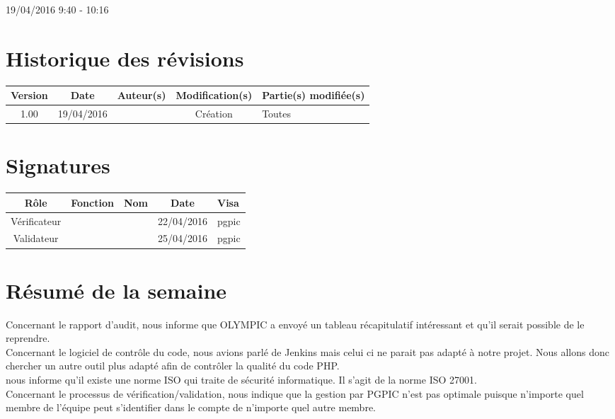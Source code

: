 \documentclass [a4paper] {article}
\begin{document}
\rhead{}

19/04/2016
\hfill   
\hfill 	9:40 - 10:16 				%



\section*{Historique des révisions}
\begin{center}
			\begin{tabular}{| c | c | c | c | p{4cm} |}
				\hline
				\rowcolor{Gray}
				Version & Date & Auteur(s) & Modification(s) & Partie(s) modifiée(s)		 \\
				\hline
				1.00 & 19/04/2016 & \Pierre & Création & Toutes \\
		\hline		
			\end{tabular}
		\end{center}

\section*{Signatures}

		\begin{center}
			\begin{tabular}{| c | c | c | c | p{4cm} |}
				\hline
				\rowcolor{Gray}
				Rôle & Fonction & Nom & Date & Visa		 \\
				\hline
				Vérificateur & \RQA & \Kafui & 22/04/2016 & pgpic \\[30pt]
				\hline
				Validateur & \CP & \Sergi & 25/04/2016 & pgpic \\[30pt]	
				\hline
			\end{tabular}
		\end{center}


\section{Résumé de la semaine}

Concernant le rapport d'audit, \nomTuteurQualite{} nous informe que OLYMPIC a envoyé un tableau récapitulatif intéressant et qu'il serait possible de le reprendre. \\
\indent
Concernant le logiciel de contrôle du code, nous avions parlé de Jenkins mais celui ci ne parait pas adapté à notre projet. Nous allons donc chercher un autre outil plus adapté afin de contrôler la qualité du code PHP. \\
\indent
\nomTuteurQualite{} nous informe qu'il existe une norme ISO qui traite de sécurité informatique. Il s'agit de la norme ISO 27001. \\
\indent
Concernant le processus de vérification/validation, \nomTuteurQualite{} nous indique que la gestion par PGPIC n'est pas optimale puisque n'importe quel membre de l'équipe peut s'identifier dans le compte de n'importe quel autre membre.
\end{document}
